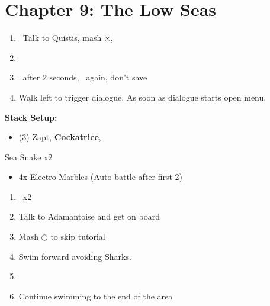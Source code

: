 \chapter{Chapter 9: The Low Seas}
\begin{enumerate}
	\item \cs\, Talk to Quistis, mash $\times$, \cs\
	\item {}
	\item \cs\ after 2 seconds, \cs\ again, don't save
	\item Walk left to trigger dialogue. As soon as dialogue starts open menu.
\end{enumerate}
\begin{menu}
\textbf{Stack Setup:}
	\begin{itemize}
		\item (3) Zapt, \textbf{Cockatrice}, \reynn\
	\end{itemize}
\end{menu}
\begin{battle}[]{Sea Snake x2}
	\begin{itemize}
		\item 4x Electro Marbles (Auto-battle after first 2)
	\end{itemize}
\end{battle}
\begin{enumerate}[resume]
	\item \cs\ x2
	\item Talk to Adamantoise and get on board
	\item Mash $\bigcirc$ to skip tutorial
	\item Swim forward avoiding Sharks. 
	\item \cs\
	\item Continue swimming to the end of the area
\end{enumerate}